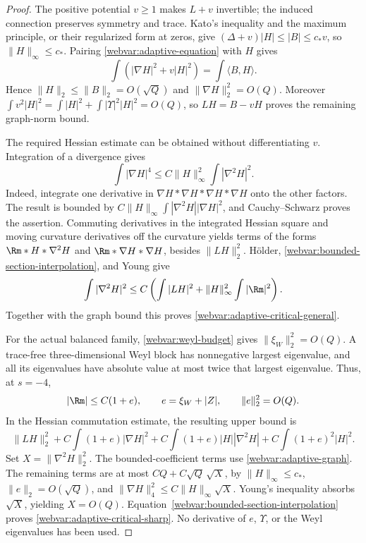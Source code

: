 \begin{proof}
The positive potential $v\ge1$ makes $L+v$ invertible; the induced
connection preserves symmetry and trace.  Kato's inequality and
the maximum principle, or their regularized form at zeros, give
$(\Delta+v)|H|\le|B|\le c_*v$, so $\|H\|_\infty\le c_*$.
Pairing \eqref{webvar:adaptive-equation} with $H$ gives
\[
 \int(|\nabla H|^2+v|H|^2)=\int\langle B,H\rangle .
\]
Hence $\|H\|_2\le\|B\|_2=O(\sqrt Q)$ and
$\|\nabla H\|_2^2=O(Q)$.
Moreover
$\int v^2|H|^2=\int|H|^2+\int|\Upsilon|^2|H|^2=O(Q)$,
so $LH=B-vH$ proves the remaining graph-norm bound.

The required Hessian estimate can be obtained without differentiating
$v$.  Integration of a divergence gives
\begin{equation}\label{webvar:bounded-section-interpolation}
 \int|\nabla H|^4\le C\|H\|_\infty^2\int|\nabla^2H|^2.
\end{equation}
Indeed, integrate one derivative in
$\nabla H*\nabla H*\nabla H*\nabla H$ onto the other factors.
The result is bounded by
$C\|H\|_\infty\int|\nabla^2H||\nabla H|^2$,
and Cauchy--Schwarz proves the assertion.
Commuting derivatives in the integrated Hessian square and moving
curvature derivatives off the curvature yields terms of the forms
$\Rm*H*\nabla^2H$ and $\Rm*\nabla H*\nabla H$, besides $\|LH\|_2^2$.
H\"older, \eqref{webvar:bounded-section-interpolation}, and Young give
\[
 \int|\nabla^2H|^2
 \le C\left(\int|LH|^2+\|H\|_\infty^2\int|\Rm|^2\right).
\]
Together with the graph bound this proves
\eqref{webvar:adaptive-critical-general}.

For the actual balanced family, \eqref{webvar:weyl-budget} gives
$\|\xi_W\|_2^2=O(Q)$.  A trace-free three-dimensional Weyl block has
nonnegative largest eigenvalue, and all its eigenvalues have absolute
value at most twice that largest eigenvalue.  Thus, at $s=-4$,
\begin{equation}\label{webvar:actual-curvature-envelope}
 |\Rm|\le C(1+e),\qquad e=\xi_W+|Z|,\qquad \|e\|_2^2=O(Q).
\end{equation}
In the Hessian commutation estimate, the resulting upper bound is
\[
 \|LH\|_2^2+C\int(1+e)|\nabla H|^2
 +C\int(1+e)|H||\nabla^2H|+C\int(1+e)^2|H|^2.
\]
Set $X=\|\nabla^2H\|_2^2$.
The bounded-coefficient terms use \eqref{webvar:adaptive-graph}.
The remaining terms are at most
$C Q+C\sqrt Q\,\sqrt X$, by $\|H\|_\infty\le c_*$,
$\|e\|_2=O(\sqrt Q)$, and
$\|\nabla H\|_4^2\le C\|H\|_\infty\sqrt X$.
Young's inequality absorbs $\sqrt X$, yielding $X=O(Q)$.
Equation~\eqref{webvar:bounded-section-interpolation} proves
\eqref{webvar:adaptive-critical-sharp}.  No derivative of $e$,
$\Upsilon$, or the Weyl eigenvalues has been used.
\end{proof}

